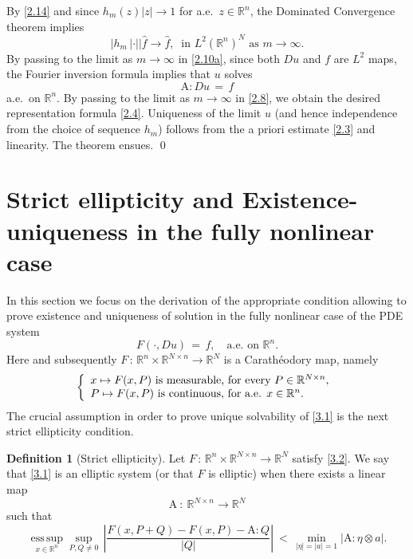 \documentclass{amsart}
\theoremstyle{definition}
\newtheorem{definition}[theorem]{Definition}
\numberwithin{equation}{section}
\begin{document}
By \eqref{2.14} and since $h_m(z)|z|{\rightarrow} 1$ for a.e.\ $z\in {\mathbb{R}}^n$, the Dominated Convergence theorem implies
\[
\big|h_m\, | \cdot | \big|\widehat{f} {\longrightarrow} \widehat{f}, \ \text{ in  $L^2({\mathbb{R}}^n)^N$ as } m{\rightarrow} \infty. 
\]
By passing to the limit as $m{\rightarrow} \infty$ in \eqref{2.10a}, since both $Du$ and $f$ are $L^2$ maps, the Fourier inversion formula implies that $u$ solves 
\[
{\textrm{A}}:Du\, =\, f
\]
a.e.\ on ${\mathbb{R}}^n$. By passing to the limit as $m{\rightarrow} \infty$ in \eqref{2.8}, we obtain the desired representation formula \eqref{2.4}. Uniqueness of the limit $u$ (and hence independence from the choice of sequence $h_m$) follows from the a priori estimate \eqref{2.3} and linearity. The theorem ensues.       \qed

\section{Strict ellipticity and Existence-uniqueness in the fully nonlinear case} \label{section3}
{\medskip}

In this section we focus on the derivation of the appropriate condition allowing to prove existence and uniqueness of solution in the fully nonlinear case of the PDE system
\begin{equation}  \label{3.1}
F(\cdot,Du ) \,=\,  f, \ \ \ \text{ a.e.\ on }{\mathbb{R}}^n.
\end{equation}
Here and subsequently $F\, :\, {\mathbb{R}}^{n} {\times} {\mathbb{R}}^{N {\times} n} {\longrightarrow}  {\mathbb{R}}^N$  is a Carath\'eodory map, namely
\begin{equation} \label{3.2}
\left\{
\begin{array}{l} 
x\mapsto F(x,P) \text{ is measurable, for every } P\in {\mathbb{R}}^{N{\times} n},{\medskip}\\
P\mapsto F(x,P) \text{ is continuous, for a.e. } x\in {\mathbb{R}}^{n}.
\end{array}
\right.
\end{equation}
The crucial assumption in order to prove unique solvability of \eqref{3.1} is the next strict ellipticity condition.

\begin{definition}[Strict ellipticity] \label{def1} Let $F\, :\, {\mathbb{R}}^{n} {\times} {\mathbb{R}}^{N {\times} n} {\longrightarrow}  {\mathbb{R}}^N$ satisfy \eqref{3.2}. We say  that \eqref{3.1} is an elliptic system (or that $F$ is elliptic) when there exists a linear map
\[
{\textrm{A}} \ : \ {\mathbb{R}}^{N{\times} n} {\longrightarrow} {\mathbb{R}}^N
\]
such that
\begin{equation} \label{3.3}
\underset{x\in {\mathbb{R}}^n}{{\textrm{ess}}\,\sup} \sup_{P,Q\neq 0}\,\left| \frac{F(x,P+Q) -F(x,P) -{\textrm{A}}:Q}{|Q|}\right| \ <\, \min_{|\eta|=|a|=1}\big| {\textrm{A}}:\eta {\otimes} a \big|.
\end{equation}
\end{definition}
\end{document}
